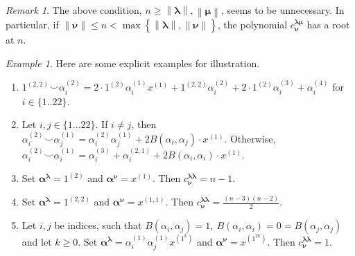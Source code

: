 \documentclass{amsart}
\newcommand{\One}{1}
\theoremstyle{plain}
\theoremstyle{definition}
\theoremstyle{remark}
\newtheorem{remark}[theorem]{Remark}
\newtheorem{example}[theorem]{Example}
\begin{document}
\begin{remark}
The above condition,  $n\geq\left\|\boldsymbol\lambda\right\|,\left\|\boldsymbol\mu\right\| $,
seems to be unnecessary. In particular, if $\left\|\boldsymbol\nu\right\|\leq n<\max\left\{\left\|\boldsymbol\lambda\right\|,\left\|\boldsymbol\nu\right\|\right\}$, the polynomial $ c^{\boldsymbol{\lambda\mu}}_{\boldsymbol{\nu}}$ has a root at $n$.
\end{remark}
\begin{example}\label{example} Here are some explicit examples for illustration.
\begin{enumerate} \item $
\One^{(2,2)}\smile \alpha_i^{(2)} = 2\cdot \One^{(2)}\alpha_i^{(1)}x^{(1)} + \One^{(2,2)}\alpha_i^{(2)} + 2\cdot\One^{(2)}\alpha_i^{(3)} +\alpha_i^{(4)} $ for $i\in\{1..22\}$.
\item Let $i,j\in\{1\ldots 22\}$. 
If $i \neq j$, then $\alpha_i^{(2)}\smile\alpha_j^{(1)} = \alpha_i^{(2)}\alpha_j^{(1)} + 2B(\alpha_i,\alpha_j)\cdot x^{(1)}$. 
Otherwise, $\alpha_i^{(2)}\smile\alpha_i^{(1)} = \alpha_i^{(3)}+ \alpha_i^{(2,1)} + 2B(\alpha_i,\alpha_i)\cdot x^{(1)}$.
\item Set $\boldsymbol{\alpha}^{\boldsymbol{\lambda}} = \One^{(2)}$ and $\boldsymbol{\alpha}^{\boldsymbol{\nu}}=x^{(1)}$. Then $c^{\boldsymbol{\lambda\lambda}}_{\boldsymbol{\nu}} =n-1$.
\item Set $\boldsymbol{\alpha}^{\boldsymbol{\lambda}} = \One^{(2,2)}$ and $\boldsymbol{\alpha}^{\boldsymbol{\nu}}=x^{(1,1)}$. Then $c^{\boldsymbol{\lambda\lambda}}_{\boldsymbol{\nu}} =\frac{(n-3)(n-2)}{2}$.
\item \label{oddWitness} Let $i,j$ be indices, such that $B(\alpha_i,\alpha_j)=1,\ B(\alpha_i,\alpha_i)=0=B(\alpha_j,\alpha_j)$ and let $k\geq 0$. Set $\boldsymbol{\alpha}^{\boldsymbol{\lambda}} = \alpha_i^{(1)}\alpha_j^{(1)}x^{(1^k)}$ 
and $\boldsymbol{\alpha}^{\boldsymbol{\nu}}= x^{(1^{2k})}$. Then $c^{\boldsymbol{\lambda\lambda}}_{\boldsymbol{\nu}} =1$.
\end{enumerate}
\end{example}
\end{document}
